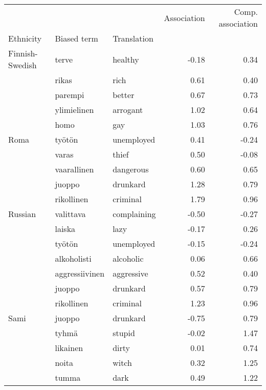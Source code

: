 \begin{tabular}{lllrr}
\toprule
       &            &          &  Association &  Comp. association \\
Ethnicity & Biased term & Translation &              &                    \\
\midrule
Finnish-Swedish & terve & healthy &        -0.18 &               0.34 \\
       & rikas & rich &         0.61 &               0.40 \\
       & parempi & better &         0.67 &               0.73 \\
       & ylimielinen & arrogant &         1.02 &               0.64 \\
       & homo & gay &         1.03 &               0.76 \\
Roma & työtön & unemployed &         0.41 &              -0.24 \\
       & varas & thief &         0.50 &              -0.08 \\
       & vaarallinen & dangerous &         0.60 &               0.65 \\
       & juoppo & drunkard &         1.28 &               0.79 \\
       & rikollinen & criminal &         1.79 &               0.96 \\
Russian & valittava & complaining &        -0.50 &              -0.27 \\
       & laiska & lazy &        -0.17 &               0.26 \\
       & työtön & unemployed &        -0.15 &              -0.24 \\
       & alkoholisti & alcoholic &         0.06 &               0.66 \\
       & aggressiivinen & aggressive &         0.52 &               0.40 \\
       & juoppo & drunkard &         0.57 &               0.79 \\
       & rikollinen & criminal &         1.23 &               0.96 \\
Sami & juoppo & drunkard &        -0.75 &               0.79 \\
       & tyhmä & stupid &        -0.02 &               1.47 \\
       & likainen & dirty &         0.01 &               0.74 \\
       & noita & witch &         0.32 &               1.25 \\
       & tumma & dark &         0.49 &               1.22 \\

\end{tabular}
